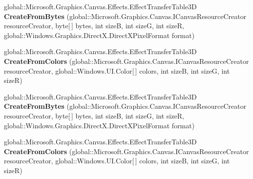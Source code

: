 \begin{DoxyCompactItemize}
\item 
\mbox{\label{interface_microsoft_1_1_graphics_1_1_canvas_1_1_effects_1_1_i_effect_transfer_table3_d_statics_ac1a661dd1e7abbf576d8ff78f4e17171}} 
global\+::\+Microsoft.\+Graphics.\+Canvas.\+Effects.\+Effect\+Transfer\+Table3D {\bfseries Create\+From\+Bytes} (global\+::\+Microsoft.\+Graphics.\+Canvas.\+I\+Canvas\+Resource\+Creator resource\+Creator, byte\mbox{[}$\,$\mbox{]} bytes, int sizeB, int sizeG, int sizeR, global\+::\+Windows.\+Graphics.\+Direct\+X.\+Direct\+X\+Pixel\+Format format)
\item 
\mbox{\label{interface_microsoft_1_1_graphics_1_1_canvas_1_1_effects_1_1_i_effect_transfer_table3_d_statics_ac91fd90ed33239f56927bf545d88da2a}} 
global\+::\+Microsoft.\+Graphics.\+Canvas.\+Effects.\+Effect\+Transfer\+Table3D {\bfseries Create\+From\+Colors} (global\+::\+Microsoft.\+Graphics.\+Canvas.\+I\+Canvas\+Resource\+Creator resource\+Creator, global\+::\+Windows.\+U\+I.\+Color\mbox{[}$\,$\mbox{]} colors, int sizeB, int sizeG, int sizeR)
\item 
\mbox{\label{interface_microsoft_1_1_graphics_1_1_canvas_1_1_effects_1_1_i_effect_transfer_table3_d_statics_ac1a661dd1e7abbf576d8ff78f4e17171}} 
global\+::\+Microsoft.\+Graphics.\+Canvas.\+Effects.\+Effect\+Transfer\+Table3D {\bfseries Create\+From\+Bytes} (global\+::\+Microsoft.\+Graphics.\+Canvas.\+I\+Canvas\+Resource\+Creator resource\+Creator, byte\mbox{[}$\,$\mbox{]} bytes, int sizeB, int sizeG, int sizeR, global\+::\+Windows.\+Graphics.\+Direct\+X.\+Direct\+X\+Pixel\+Format format)
\item 
\mbox{\label{interface_microsoft_1_1_graphics_1_1_canvas_1_1_effects_1_1_i_effect_transfer_table3_d_statics_ac91fd90ed33239f56927bf545d88da2a}} 
global\+::\+Microsoft.\+Graphics.\+Canvas.\+Effects.\+Effect\+Transfer\+Table3D {\bfseries Create\+From\+Colors} (global\+::\+Microsoft.\+Graphics.\+Canvas.\+I\+Canvas\+Resource\+Creator resource\+Creator, global\+::\+Windows.\+U\+I.\+Color\mbox{[}$\,$\mbox{]} colors, int sizeB, int sizeG, int sizeR)

\end{DoxyCompactItemize}
